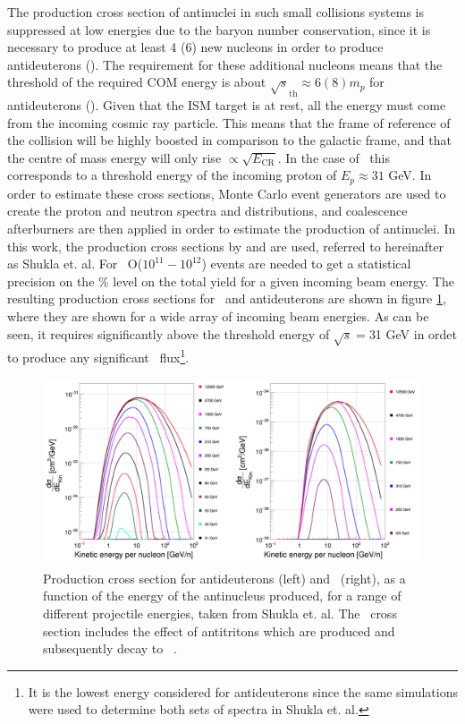 The production cross section of antinuclei in such small collisions systems is suppressed at low energies due to the baryon number conservation, since it is necessary to produce at least 4 (6) new nucleons in order to produce antideuterons (\ahe). The requirement for these additional nucleons means that the threshold of the required COM energy is about $\sqrt{s}_{\mathrm{th}}\approx 6 (8)  m_p$ for antideuterons (\ahe ). Given that the ISM target is at rest, all the energy must come from the incoming cosmic ray particle. This means that the frame of reference of the collision will be highly boosted in comparison to the galactic frame, and that the centre of mass energy will only rise $\propto \sqrt{E_\mathrm{CR}}$. 
In the case of \ahe\ this corresponds to a threshold energy of the incoming proton of $E_p \approx 31$ GeV. In order to estimate these cross sections, Monte Carlo event generators are used to create the proton and neutron spectra and distributions, and coalescence afterburners are then applied in order to estimate the production of antinuclei. In this work, the production cross sections by \cite{Shukla} and \cite{Gomez} are used, referred to hereinafter as Shukla et. al. For \ahe\, O($10^{11}-10^{12}$) events are needed to get a statistical precision on the \% level on the total yield for a given incoming beam energy\cite{Shukla}. The resulting production cross sections for \ahe\ and antideuterons are shown in figure \ref{fig:CR_production_XS}, where they are shown for a wide array of incoming beam energies. As can be seen, it requires significantly above the threshold energy of $\sqrt{s}=$31 GeV in ordet to produce any significant \ahe\ flux\footnote{It is the lowest energy considered for antideuterons since the same simulations were used to determine both sets of spectra in Shukla et. al.}.

\begin{figure}[htbp]
    \centering
    \includegraphics[width=\textwidth]{figures/production_xs_shukla.png}
    \caption{Production cross section for antideuterons (left) and \ahe\ (right), as a function of the energy of the antinucleus produced, for a range of different projectile energies, taken from Shukla et. al. The \ahe\ cross section includes the effect of antitritons which are produced and subsequently decay to \ahe\ . }
    \label{fig:CR_production_XS}
\end{figure}

